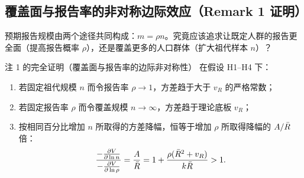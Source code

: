 \subsection{覆盖面与报告率的非对称边际效应（Remark 1 证明）}

预期报告规模由两个途径共同构成：$m = \rho n$。究竟应该追求让既定人群的报告更全面（提高报告概率 $\rho$），还是覆盖更多的人口群体（扩大祖代样本 $n$）？

\begin{theorembox}{注 1 的完全证明（覆盖面与报告率的边际非对称性）}
在假设 H1--H4 下：
\begin{enumerate}[label=(\roman*)]
  \item 若固定祖代规模 $n$ 而令报告率 $\rho \to 1$，方差趋于大于 $v_R$ 的严格常数；
  \item 若固定报告率 $\rho$ 而令覆盖规模 $n \to \infty$，方差趋于理论底板 $v_R$；
  \item 按相同百分比增加 $n$ 所取得的方差降幅，恒等于增加 $\rho$ 所取得降幅的 $A/\bar{R}$ 倍：
  \begin{equation}
    \frac{-\frac{\partial V}{\partial \ln n}}{-\frac{\partial V}{\partial \ln \rho}} = \frac{A}{\bar{R}} = 1 + \frac{\rho(\bar{R}^2 + v_R)}{k\bar{R}} > 1.
    \label{eq:asym-ratio}
  \end{equation}
\end{enumerate}
\end{theorembox}

